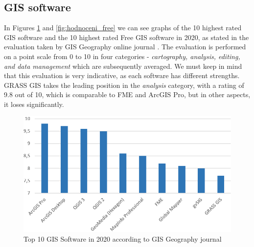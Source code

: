 \documentclass[a4paper,10pt,twoside]{article}
\begin{document}
\subsection{GIS software}
\label{subsection:GIS software}

\noindent In Figures \ref{fig:hodnoceni_all} and
\ref{fig:hodnoceni_free} we can see graphs of the 10 highest rated GIS
software and the 10 highest rated Free GIS software in 2020, as stated
in the evaluation taken by GIS Geography online journal
\cite{gisgeography}. The evaluation is performed on a point scale from
0 to 10 in four categories - \textit{cartography, analysis, editing,
  and data management} which are subsequently averaged. We must keep
in mind that this evaluation is very indicative, as each software has
different strengths. GRASS GIS takes the leading position in the
\textit{analysis} category, with a rating of 9.8 out of 10, which is
comparable to FME and ArcGIS Pro, but in other aspects, it loses
significantly.

\vspace{0.3cm}
\begin{figure}[hbt!] 
\begin{center}
\includegraphics[width=13cm]{../pictures/hodnoceni_all.png} 
\caption[Top 10 GIS Software in 2020 according to GISGeography journal]{Top 10 GIS Software in 2020 according to GIS Geography journal \cite{gisgeography}}
\label{fig:hodnoceni_all}
\end{center}
\end{figure}
\end{document}
